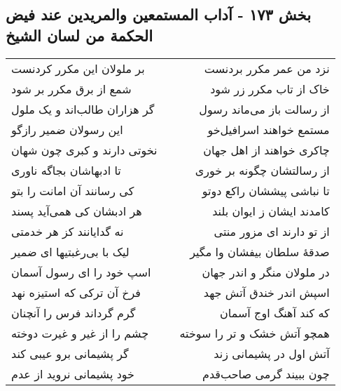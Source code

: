 \begin{center}
\section*{بخش ۱۷۳ - آداب المستمعین والمریدین عند فیض  الحکمة من لسان الشیخ}
\label{sec:sh173}
\begin{longtable}{l p{0.5cm} r}
بر ملولان این مکرر کردنست
&&
نزد من عمر مکرر بردنست
\\
شمع از برق مکرر بر شود
&&
خاک از تاب مکرر زر شود
\\
گر هزاران طالب‌اند و یک ملول
&&
از رسالت باز می‌ماند رسول
\\
این رسولان ضمیر رازگو
&&
مستمع خواهند اسرافیل‌خو
\\
نخوتی دارند و کبری چون شهان
&&
چاکری خواهند از اهل جهان
\\
تا ادبهاشان بجاگه ناوری
&&
از رسالتشان چگونه بر خوری
\\
کی رسانند آن امانت را بتو
&&
تا نباشی پیششان راکع دوتو
\\
هر ادبشان کی همی‌آید پسند
&&
کامدند ایشان ز ایوان بلند
\\
نه گدایانند کز هر خدمتی
&&
از تو دارند ای مزور منتی
\\
لیک با بی‌رغبتیها ای ضمیر
&&
صدقهٔ سلطان بیفشان وا مگیر
\\
اسپ خود را ای رسول آسمان
&&
در ملولان منگر و اندر جهان
\\
فرخ آن ترکی که استیزه نهد
&&
اسپش اندر خندق آتش جهد
\\
گرم گرداند فرس را آنچنان
&&
که کند آهنگ اوج آسمان
\\
چشم را از غیر و غیرت دوخته
&&
همچو آتش خشک و تر را سوخته
\\
گر پشیمانی برو عیبی کند
&&
آتش اول در پشیمانی زند
\\
خود پشیمانی نروید از عدم
&&
چون ببیند گرمی صاحب‌قدم
\\
\end{longtable}
\end{center}
